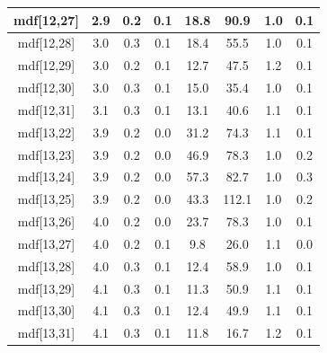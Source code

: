 \begin{longtable}{|c|c|c|c|c|c|c|c|}
\hline
mdf[12,27] & 2.9 & 0.2 & 0.1 & 18.8 & 90.9 & 1.0 & 0.1 \\
\hline
mdf[12,28] & 3.0 & 0.3 & 0.1 & 18.4 & 55.5 & 1.0 & 0.1 \\
\hline
mdf[12,29] & 3.0 & 0.2 & 0.1 & 12.7 & 47.5 & 1.2 & 0.1 \\
\hline
mdf[12,30] & 3.0 & 0.3 & 0.1 & 15.0 & 35.4 & 1.0 & 0.1 \\
\hline
mdf[12,31] & 3.1 & 0.3 & 0.1 & 13.1 & 40.6 & 1.1 & 0.1 \\
\hline
mdf[13,22] & 3.9 & 0.2 & 0.0 & 31.2 & 74.3 & 1.1 & 0.1 \\
\hline
mdf[13,23] & 3.9 & 0.2 & 0.0 & 46.9 & 78.3 & 1.0 & 0.2 \\
\hline
mdf[13,24] & 3.9 & 0.2 & 0.0 & 57.3 & 82.7 & 1.0 & 0.3 \\
\hline
mdf[13,25] & 3.9 & 0.2 & 0.0 & 43.3 & 112.1 & 1.0 & 0.2 \\
\hline
mdf[13,26] & 4.0 & 0.2 & 0.0 & 23.7 & 78.3 & 1.0 & 0.1 \\
\hline
mdf[13,27] & 4.0 & 0.2 & 0.1 & 9.8 & 26.0 & 1.1 & 0.0 \\
\hline
mdf[13,28] & 4.0 & 0.3 & 0.1 & 12.4 & 58.9 & 1.0 & 0.1 \\
\hline
mdf[13,29] & 4.1 & 0.3 & 0.1 & 11.3 & 50.9 & 1.1 & 0.1 \\
\hline
mdf[13,30] & 4.1 & 0.3 & 0.1 & 12.4 & 49.9 & 1.1 & 0.1 \\
\hline
mdf[13,31] & 4.1 & 0.3 & 0.1 & 11.8 & 16.7 & 1.2 & 0.1 \\
\hline
\end{longtable}
